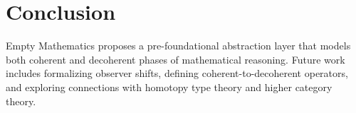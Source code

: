 \documentclass[11pt]{article}
\begin{document}
\section{Conclusion}
Empty Mathematics proposes a pre-foundational abstraction layer that models both coherent and decoherent phases of mathematical reasoning. Future work includes formalizing observer shifts, defining coherent-to-decoherent operators, and exploring connections with homotopy type theory and higher category theory.
\end{document}
